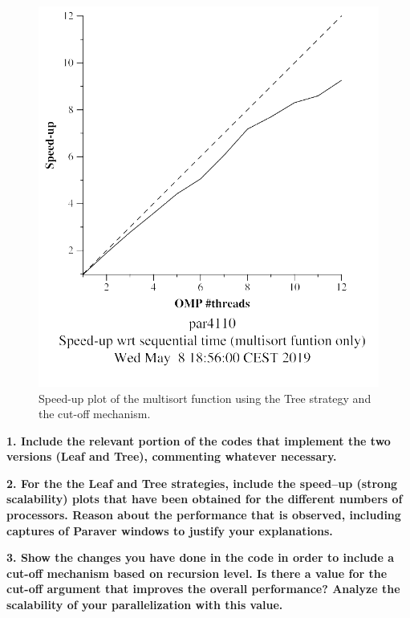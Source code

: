 \documentclass[12pt, a4paper]{article}
\begin{document}
\begin{figure}[H]
\begin{minipage}[b]{0.4\linewidth}
  \includegraphics[scale=0.5]{./S2/S2_strong_scalability/multisort-omp-strong_boada-4_tree_cutoff_multisort_only}
  \caption{Speed-up plot of the multisort function using the Tree strategy and the cut-off mechanism.}
  \label{fig:mandel-omp-10000-strong-21-speedup}
\end{minipage}
\end{figure}

\break

\textbf{1. Include the relevant portion of the codes that implement the two versions (Leaf and Tree), commenting whatever necessary.}

\textbf{2. For the the Leaf and Tree strategies, include the speed–up (strong scalability) plots that have been
obtained for the different numbers of processors. Reason about the performance that is observed,
including captures of Paraver windows to justify your explanations.}

\textbf{3. Show the changes you have done in the code in order to include a cut-off mechanism based on
recursion level. Is there a value for the cut-off argument that improves the overall performance?
Analyze the scalability of your parallelization with this value.}
\end{document}
